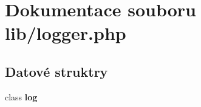 \section{Dokumentace souboru lib/logger.php}
\label{d6/d9c/logger_8php}
\subsection*{Datové struktry}
\begin{DoxyCompactItemize}
\item 
class {\bf log}
\end{DoxyCompactItemize}
